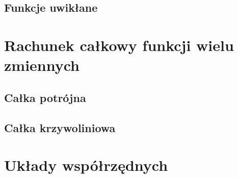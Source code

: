 \documentclass[11pt]{scrartcl}
\begin{document}
        \subsection{Funkcje uwikłane}
        

    \section{Rachunek całkowy funkcji wielu zmiennych}
    
        \subsection{Całka potrójna}
        
        \subsection{Całka krzywoliniowa}
        


    \appendix

    \section{Układy współrzędnych} \label{s:coordinate systems}
    
\end{document}
